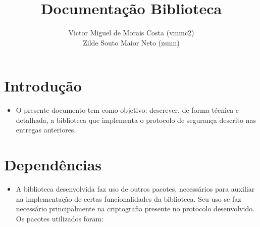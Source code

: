 \documentclass[10pt]{article}
\title{Documentação Biblioteca}
\author{
Victor Miguel de Morais Costa (vmmc2) \\
Zilde Souto Maior Neto (zsmn)
}
\date{}
\begin{document}
\maketitle

\section{Introdução}
    \begin{itemize}
    \item O presente documento tem como objetivo: descrever, de forma técnica e detalhada, a biblioteca que implementa o protocolo de segurança descrito nas entregas anteriores.
    \end{itemize}

\section{Dependências}
    \begin{itemize}
    \item A biblioteca desenvolvida faz uso de outros pacotes, necessários para auxiliar na implementação de certas funcionalidades da biblioteca. Seu uso se faz necessário principalmente na criptografia presente no protocolo desenvolvido. Os pacotes utilizados foram:
    \end{itemize} 
    
\end{document}
